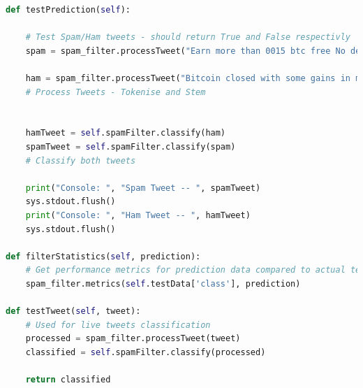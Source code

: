 \documentclass[oneside, 12pt]{article}
\begin{document}
\begin{lstlisting}[language=python, caption=Spam filter training Class - \textit{tweet\_collector.py}]
def testPrediction(self):
				
	# Test Spam/Ham tweets - should return True and False respectivly
	spam = spam_filter.processTweet("Earn more than 0015 btc free No deposit No investment Free Bitcoins - Earn $65 free btc in 5 minutes bitcoin freebtc getbtc")
				
	ham = spam_filter.processTweet("Bitcoin closed with some gains in month of February")
	# Process Tweets - Tokenise and Stem
	
	
	hamTweet = self.spamFilter.classify(ham)
	spamTweet = self.spamFilter.classify(spam)
	# Classify both tweets
				
	print("Console: ", "Spam Tweet -- ", spamTweet)
	sys.stdout.flush()
	print("Console: ", "Ham Tweet -- ", hamTweet)
	sys.stdout.flush()
				
def filterStatistics(self, prediction):
	# Get performance metrics for prediction data compared to actual test data
	spam_filter.metrics(self.testData['class'], prediction)
				
def testTweet(self, tweet):
	# Used for live tweets classification
	processed = spam_filter.processTweet(tweet)
	classified = self.spamFilter.classify(processed)
				
	return classified
		\end{lstlisting}
		
\end{document}
